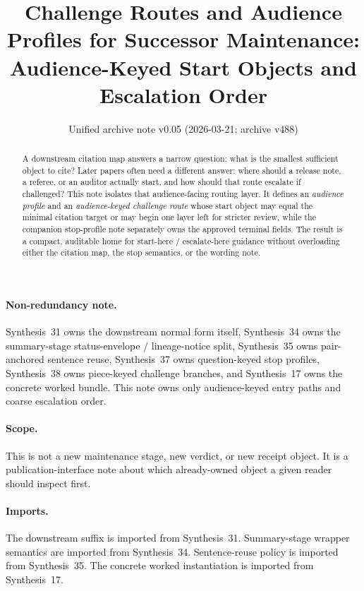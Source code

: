 \documentclass[11pt]{article}
\title{Challenge Routes and Audience Profiles for Successor Maintenance:\\[0.5ex]
\large Audience-Keyed Start Objects and Escalation Order}
\author{}
\date{Unified archive note v0.05 (2026-03-21; archive v488)}
\begin{document}
\maketitle

\begin{abstract}
A downstream citation map answers a narrow question: what is the smallest sufficient object to cite?
Later papers often need a different answer: where should a release note, a referee, or an auditor actually start, and how should that route escalate if challenged?
This note isolates that audience-facing routing layer.
It defines an \emph{audience profile} and an \emph{audience-keyed challenge route} whose start object may equal the minimal citation target or may begin one layer left for stricter review, while the companion stop-profile note separately owns the approved terminal fields.
The result is a compact, auditable home for start-here / escalate-here guidance without overloading either the citation map, the stop semantics, or the wording note.
\end{abstract}

\paragraph{Non-redundancy note.}
Synthesis~31 owns the downstream normal form itself, Synthesis~34 owns the summary-stage status-envelope / lineage-notice split, Synthesis~35 owns pair-anchored sentence reuse, Synthesis~37 owns question-keyed stop profiles, Synthesis~38 owns piece-keyed challenge branches, and Synthesis~17 owns the concrete worked bundle. This note owns only audience-keyed entry paths and coarse escalation order.

\paragraph{Scope.}
This is not a new maintenance stage, new verdict, or new receipt object. It is a publication-interface note about which already-owned object a given reader should inspect first.

\paragraph{Imports.}
The downstream suffix is imported from Synthesis~31.\cite{series:downstreamnormalforms}
Summary-stage wrapper semantics are imported from Synthesis~34.\cite{series:statusenvelopes}
Sentence-reuse policy is imported from Synthesis~35.\cite{series:sentencelocks}
The concrete worked instantiation is imported from Synthesis~17.\cite{series:workedexample}
\end{document}
